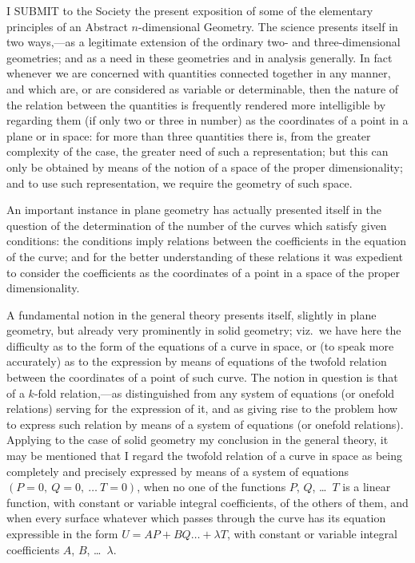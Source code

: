 \documentclass[11pt,a4paper]{article}
\theoremstyle{definition}
\begin{document}
I SUBMIT to the Society the present exposition of some of the elementary principles of an Abstract $n$-dimensional Geometry. The science presents itself in two ways,---as a legitimate extension of the ordinary two- and three-dimensional geometries; and as a need in these geometries and in analysis generally. In fact whenever we are concerned with quantities connected together in any manner, and which are, or are considered as variable or determinable, then the nature of the relation between the quantities is frequently rendered more intelligible by regarding them (if only two or three in number) as the coordinates of a point in a plane or in space: for more than three quantities there is, from the greater complexity of the case, the greater need of such a representation; but this can only be obtained by means of the notion of a space of the proper dimensionality; and to use such representation, we require the geometry of such space.

An important instance in plane geometry has actually presented itself in the question of the determination of the number of the curves which satisfy given conditions: the conditions imply relations between the coefficients in the equation of the curve; and for the better understanding of these relations it was expedient to consider the coefficients as the coordinates of a point in a space of the proper dimensionality.

A fundamental notion in the general theory presents itself, slightly in plane geometry, but already very prominently in solid geometry; viz.\ we have here the difficulty as to the form of the equations of a curve in space, or (to speak more accurately) as to the expression by means of equations of the twofold relation between the coordinates of a point of such curve. The notion in question is that of a $k$-fold relation,---as distinguished from any system of equations (or onefold relations) serving for the expression of it, and as giving rise to the problem how to express such relation by means of a system of equations (or onefold relations). Applying to the case of solid geometry my conclusion in the general theory, it may be mentioned that I regard the twofold relation of a curve in space as being completely and precisely expressed by means of a system of equations $(P=0,\ Q=0,\ \ldots\ T=0)$, when no one of the functions $P$, $Q$, \ldots\ $T$ is a linear function, with constant or variable integral coefficients, of the others of them, and when every surface whatever which passes through the curve has its equation expressible in the form $U=AP+BQ\ldots+\lambda T$, with constant or variable integral coefficients $A$, $B$, \ldots\ $\lambda$.
\end{document}
